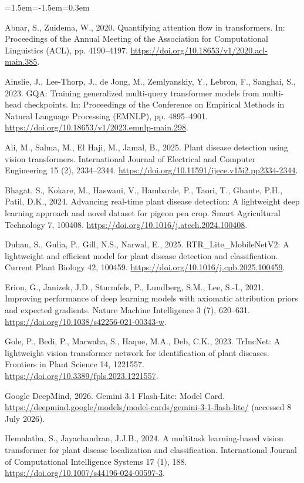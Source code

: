 \begin{list}{}{\leftmargin=1.5em\itemindent=-1.5em\itemsep=0.3em}
\item Abnar, S., Zuidema, W., 2020. Quantifying attention flow in transformers. In: Proceedings of the Annual Meeting of the Association for Computational Linguistics (ACL), pp. 4190--4197. \url{https://doi.org/10.18653/v1/2020.acl-main.385}.
\item Ainslie, J., Lee-Thorp, J., de Jong, M., Zemlyanskiy, Y., Lebron, F., Sanghai, S., 2023. GQA: Training generalized multi-query transformer models from multi-head checkpoints. In: Proceedings of the Conference on Empirical Methods in Natural Language Processing (EMNLP), pp. 4895--4901. \url{https://doi.org/10.18653/v1/2023.emnlp-main.298}.
\item Ali, M., Salma, M., El Haji, M., Jamal, B., 2025. Plant disease detection using vision transformers. International Journal of Electrical and Computer Engineering 15 (2), 2334--2344. \url{https://doi.org/10.11591/ijece.v15i2.pp2334-2344}.
\item Bhagat, S., Kokare, M., Haswani, V., Hambarde, P., Taori, T., Ghante, P.H., Patil, D.K., 2024. Advancing real-time plant disease detection: A lightweight deep learning approach and novel dataset for pigeon pea crop. Smart Agricultural Technology 7, 100408. \url{https://doi.org/10.1016/j.atech.2024.100408}.
\item Duhan, S., Gulia, P., Gill, N.S., Narwal, E., 2025. RTR\_Lite\_MobileNetV2: A lightweight and efficient model for plant disease detection and classification. Current Plant Biology 42, 100459. \url{https://doi.org/10.1016/j.cpb.2025.100459}.
\item Erion, G., Janizek, J.D., Sturmfels, P., Lundberg, S.M., Lee, S.-I., 2021. Improving performance of deep learning models with axiomatic attribution priors and expected gradients. Nature Machine Intelligence 3 (7), 620--631. \url{https://doi.org/10.1038/s42256-021-00343-w}.
\item Gole, P., Bedi, P., Marwaha, S., Haque, M.A., Deb, C.K., 2023. TrIncNet: A lightweight vision transformer network for identification of plant diseases. Frontiers in Plant Science 14, 1221557. \url{https://doi.org/10.3389/fpls.2023.1221557}.
\item Google DeepMind, 2026. Gemini 3.1 Flash-Lite: Model Card. \url{https://deepmind.google/models/model-cards/gemini-3-1-flash-lite/} (accessed 8 July 2026).
\item Hemalatha, S., Jayachandran, J.J.B., 2024. A multitask learning-based vision transformer for plant disease localization and classification. International Journal of Computational Intelligence Systems 17 (1), 188. \url{https://doi.org/10.1007/s44196-024-00597-3}.

\end{list}
